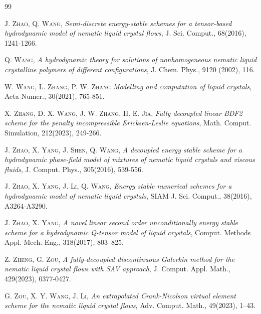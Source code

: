 \documentclass[12pt,reqno]{amsart}
\numberwithin{equation}{section}
\begin{document}
\begin{thebibliography}{99}




 \textsc{J. Zhao, Q. Wang}, \emph{Semi-discrete energy-stable schemes for a tensor-based hydrodynamic model of nematic liquid crystal flows}, J. Sci. Comput., 68(2016), 1241-1266.

 \textsc{Q. Wang}, \emph{A hydrodynamic theory for solutions of nonhomogeneous nematic liquid crystalline polymers of different configurations}, J. Chem.
Phys., 9120 (2002), 116.

 \textsc{W. Wang, L. Zhang, P. W. Zhang}
\emph{Modelling and computation of liquid crystals}, Acta Numer., 30(2021), 765-851.

 \textsc{X. Zhang, D. X. Wang, J. W. Zhang, H. E. Jia}, \emph{Fully decoupled linear BDF2 scheme for the penalty incompressible Ericksen-Leslie equations}, Math. Comput. Simulation, 212(2023), 249-266.

 \textsc{J. Zhao, X. Yang, J. Shen, Q. Wang}, \emph{A decoupled energy stable scheme for a hydrodynamic phase-field model of mixtures of nematic liquid crystals and viscous fluids}, J. Comput. Phys., 305(2016), 539-556.

 \textsc{J. Zhao, X. Yang, J. Li, Q. Wang}, \emph{Energy stable numerical schemes for a hydrodynamic model of nematic liquid crystals}, SIAM J. Sci. Comput., 38(2016), A3264-A3290.

 \textsc{J. Zhao, X. Yang}, \emph{A novel linear second order unconditionally energy stable scheme for a hydrodynamic Q-tensor model of liquid crystals},
Comput. Methods Appl. Mech. Eng., 318(2017), 803–825.


 \textsc{Z. Zheng, G. Zou}, \emph{A fully-decoupled discontinuous Galerkin method for the nematic liquid crystal flows with SAV approach},
J. Comput. Appl. Math., 429(2023), 0377-0427.

 \textsc{G. Zou, X. Y. Wang, J. Li}, \emph{An extrapolated Crank-Nicolson virtual element scheme for the nematic liquid crystal flows}, Adv. Comput. Math., 49(2023), 1–43.

\end{thebibliography}
\end{document}
